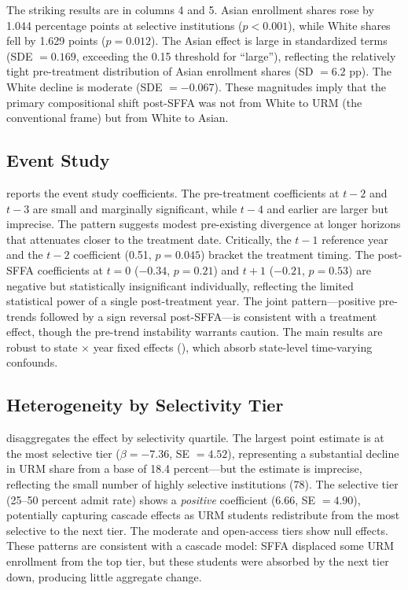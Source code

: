 \documentclass[12pt]{article}
\begin{document}
The striking results are in columns 4 and 5. Asian enrollment shares rose by 1.044 percentage points at selective institutions ($p < 0.001$), while White shares fell by 1.629 points ($p = 0.012$). The Asian effect is large in standardized terms (SDE $= 0.169$, exceeding the 0.15 threshold for ``large''), reflecting the relatively tight pre-treatment distribution of Asian enrollment shares (SD $= 6.2$ pp). The White decline is moderate (SDE $= -0.067$). These magnitudes imply that the primary compositional shift post-SFFA was not from White to URM (the conventional frame) but from White to Asian.



\subsection{Event Study}

 reports the event study coefficients. The pre-treatment coefficients at $t-2$ and $t-3$ are small and marginally significant, while $t-4$ and earlier are larger but imprecise. The pattern suggests modest pre-existing divergence at longer horizons that attenuates closer to the treatment date. Critically, the $t-1$ reference year and the $t-2$ coefficient (0.51, $p = 0.045$) bracket the treatment timing. The post-SFFA coefficients at $t=0$ ($-0.34$, $p = 0.21$) and $t+1$ ($-0.21$, $p = 0.53$) are negative but statistically insignificant individually, reflecting the limited statistical power of a single post-treatment year. The joint pattern---positive pre-trends followed by a sign reversal post-SFFA---is consistent with a treatment effect, though the pre-trend instability warrants caution. The main results are robust to state $\times$ year fixed effects (), which absorb state-level time-varying confounds.



\subsection{Heterogeneity by Selectivity Tier}

 disaggregates the effect by selectivity quartile. The largest point estimate is at the most selective tier ($\beta = -7.36$, SE $= 4.52$), representing a substantial decline in URM share from a base of 18.4 percent---but the estimate is imprecise, reflecting the small number of highly selective institutions (78). The selective tier (25--50 percent admit rate) shows a \textit{positive} coefficient (6.66, SE $= 4.90$), potentially capturing cascade effects as URM students redistribute from the most selective to the next tier. The moderate and open-access tiers show null effects. These patterns are consistent with a cascade model: SFFA displaced some URM enrollment from the top tier, but these students were absorbed by the next tier down, producing little aggregate change.
\end{document}

